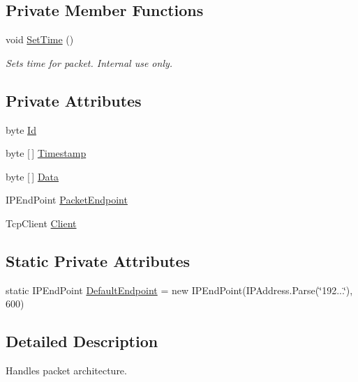 \subsection*{Private Member Functions}
\begin{DoxyCompactItemize}
\item 
void \hyperlink{class_robotics_library_1_1_communications_1_1_packet_a7003488a8d9d08f24a11953fdec60960}{Set\+Time} ()
\begin{DoxyCompactList}\small\item\em Sets time for packet. Internal use only. \end{DoxyCompactList}\end{DoxyCompactItemize}
\subsection*{Private Attributes}
\begin{DoxyCompactItemize}
\item 
byte \hyperlink{class_robotics_library_1_1_communications_1_1_packet_a6ed48c10bbd9b06fcb2dbd8172106728}{Id}
\item 
byte \mbox{[}$\,$\mbox{]} \hyperlink{class_robotics_library_1_1_communications_1_1_packet_aeaf9b3ec1923f1126c2025b1dd909468}{Timestamp}
\item 
byte \mbox{[}$\,$\mbox{]} \hyperlink{class_robotics_library_1_1_communications_1_1_packet_a16cae05afc6eda9dad5592095528d19a}{Data}
\item 
I\+P\+End\+Point \hyperlink{class_robotics_library_1_1_communications_1_1_packet_a394c86b3647f472f3a24837bba067338}{Packet\+Endpoint}
\item 
Tcp\+Client \hyperlink{class_robotics_library_1_1_communications_1_1_packet_ab276ef9ce5f4ae88a1e3e0d70a40a1f2}{Client}
\end{DoxyCompactItemize}
\subsection*{Static Private Attributes}
\begin{DoxyCompactItemize}
\item 
static I\+P\+End\+Point \hyperlink{class_robotics_library_1_1_communications_1_1_packet_ac7aa1b8ff94b4e190b284ac7b8ac4b4a}{Default\+Endpoint} = new I\+P\+End\+Point(I\+P\+Address.\+Parse(\char`\"{}192...\char`\"{}), 600)
\end{DoxyCompactItemize}


\subsection{Detailed Description}
Handles packet architecture. 



